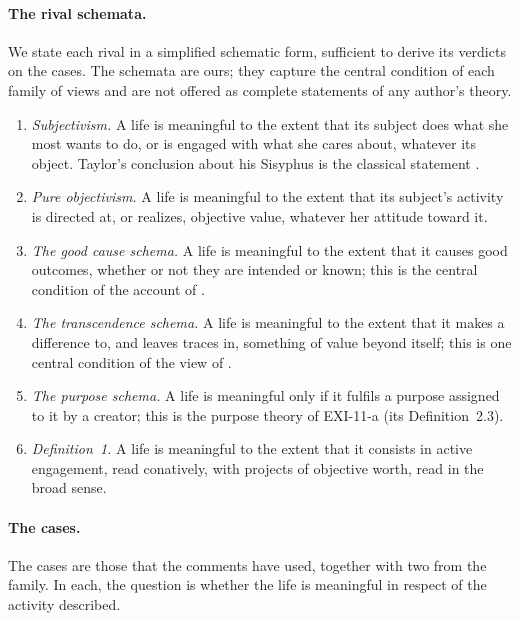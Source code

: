 \paragraph{The rival schemata.} We state each rival in a simplified schematic form, sufficient to derive its verdicts on the cases. The schemata are ours; they capture the central condition of each family of views and are not offered as complete statements of any author's theory.

\begin{enumerate}[label=(R\arabic*)]
\item \emph{Subjectivism.} A life is meaningful to the extent that its subject does what she most wants to do, or is engaged with what she cares about, whatever its object. Taylor's conclusion about his Sisyphus is the classical statement \citep{Taylor1970}.
\item \emph{Pure objectivism.} A life is meaningful to the extent that its subject's activity is directed at, or realizes, objective value, whatever her attitude toward it.
\item \emph{The good cause schema.} A life is meaningful to the extent that it causes good outcomes, whether or not they are intended or known; this is the central condition of the account of \citet{Smuts2013}.
\item \emph{The transcendence schema.} A life is meaningful to the extent that it makes a difference to, and leaves traces in, something of value beyond itself; this is one central condition of the view of \citet[ch.~6]{Nozick1981}.
\item \emph{The purpose schema.} A life is meaningful only if it fulfils a purpose assigned to it by a creator; this is the purpose theory of EXI-11-a (its Definition~2.3).
\item \emph{Definition~1.} A life is meaningful to the extent that it consists in active engagement, read conatively, with projects of objective worth, read in the broad sense.
\end{enumerate}

\paragraph{The cases.} The cases are those that the comments have used, together with two from the family. In each, the question is whether the life is meaningful in respect of the activity described.

